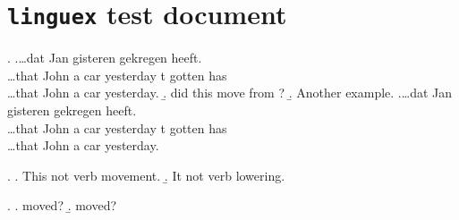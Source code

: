 \documentclass{article}
\begin{document}
\section*{\texttt{linguex} test document}


\ex. 
\arrowgloss\ag.\ldots dat Jan  gisteren   gekregen heeft.\\
\ldots that John {a \hspace*{1em} car}  yesterday t gotten has \\
\ldots that John a car yesterday.
\b.   did this move from ?
\b. Another example.
\bg.\ldots dat Jan  gisteren   gekregen heeft.\\
\ldots that John {a \hspace*{1em} car}  yesterday t gotten has \\
\ldots that John a car yesterday.

\ex.
\a. This  not  verb movement.
\b. It   not  verb lowering.

\ex.
\arrowstrut
\a.   
moved? 
\b.   
moved? 
\end{document}
